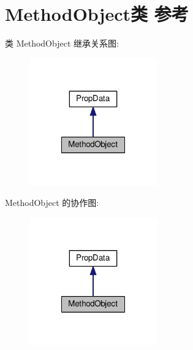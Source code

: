 \hypertarget{class_method_object}{\section{Method\+Object类 参考}
\label{class_method_object}
}


类 Method\+Object 继承关系图\+:
\nopagebreak
\begin{figure}[H]
\begin{center}
\leavevmode
\includegraphics[width=156pt]{class_method_object__inherit__graph}
\end{center}
\end{figure}


Method\+Object 的协作图\+:
\nopagebreak
\begin{figure}[H]
\begin{center}
\leavevmode
\includegraphics[width=156pt]{class_method_object__coll__graph}
\end{center}
\end{figure}
